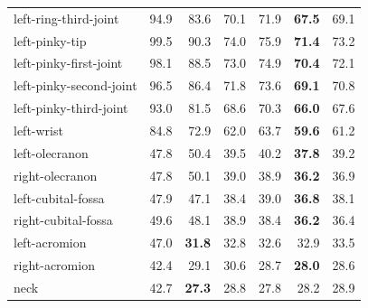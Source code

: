\begin{longtable}{lrrrrrr}
left-ring-third-joint & 94.9 & 83.6 & 70.1 & 71.9 & \textbf{67.5} & 69.1 \\ %
left-pinky-tip & 99.5 & 90.3 & 74.0 & 75.9 & \textbf{71.4} & 73.2 \\ %
left-pinky-first-joint & 98.1 & 88.5 & 73.0 & 74.9 & \textbf{70.4} & 72.1 \\ %
left-pinky-second-joint & 96.5 & 86.4 & 71.8 & 73.6 & \textbf{69.1} & 70.8 \\ %
left-pinky-third-joint & 93.0 & 81.5 & 68.6 & 70.3 & \textbf{66.0} & 67.6 \\ %
left-wrist & 84.8 & 72.9 & 62.0 & 63.7 & \textbf{59.6} & 61.2 \\ %
left-olecranon & 47.8 & 50.4 & 39.5 & 40.2 & \textbf{37.8} & 39.2 \\ %
right-olecranon & 47.8 & 50.1 & 39.0 & 38.9 & \textbf{36.2} & 36.9 \\ %
left-cubital-fossa & 47.9 & 47.1 & 38.4 & 39.0 & \textbf{36.8} & 38.1 \\ %
right-cubital-fossa & 49.6 & 48.1 & 38.9 & 38.4 & \textbf{36.2} & 36.4 \\ %
left-acromion & 47.0 & \textbf{31.8} & 32.8 & 32.6 & 32.9 & 33.5 \\ %
right-acromion & 42.4 & 29.1 & 30.6 & 28.7 & \textbf{28.0} & 28.6 \\ %
neck & 42.7 & \textbf{27.3} & 28.8 & 27.8 & 28.2 & 28.9 \\ %
\end{longtable}
